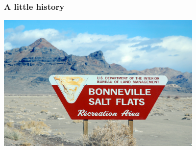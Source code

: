 \documentclass[11pt]{beamer}
\begin{document}
\begin{frame}
\frametitle{A little history}

\pause
\begin{center}
\includegraphics[width=4in]{bonnevillesign}
\end{center}

\end{frame}

\setlength{\TPHorizModule}{.1cm}
\setlength{\TPVertModule}{.1cm}

\newcommand{\carbox}[4]{%
\begin{tikzpicture}
    \node at (0,0) {#1};
    \node at (-2.68,-4.2) {\small \emph{#4}};
    \pause
    \node at #2 {#3};

\end{tikzpicture}
}
\end{document}
